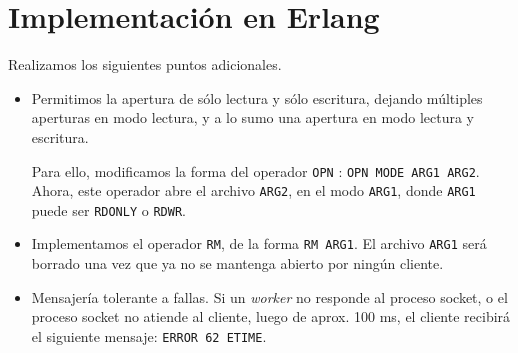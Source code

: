 \documentclass[a4paper, 8pt]{article}
\begin{document}
\begin{enumerate}
    
    
    
    
  \end{enumerate}


\section{Implementación en Erlang}

Realizamos los siguientes puntos adicionales.

\begin{itemize}
  \item Permitimos la apertura de sólo lectura y sólo escritura, dejando múltiples aperturas en modo lectura, y a lo sumo
  una apertura en modo lectura y escritura.
  
  Para ello, modificamos la forma del operador \texttt{OPN} :
  \texttt{OPN MODE ARG1 ARG2}. Ahora, este operador abre el archivo \texttt{ARG2}, en el modo \texttt{ARG1},
  donde \texttt{ARG1} puede ser \texttt{RDONLY} o \texttt{RDWR}.
  
  \item Implementamos el operador \texttt{RM}, de la forma
  \texttt{RM ARG1}. El archivo \texttt{ARG1} será borrado una vez que ya no se mantenga abierto por ningún cliente.
  
  \item Mensajería tolerante a fallas. Si un \textit{worker} no responde al proceso socket, o el proceso socket no atiende
  al cliente, luego de aprox. 100 ms, el cliente recibirá el siguiente mensaje: \texttt{ERROR 62 ETIME}.
 
\end{itemize}
\end{document}
